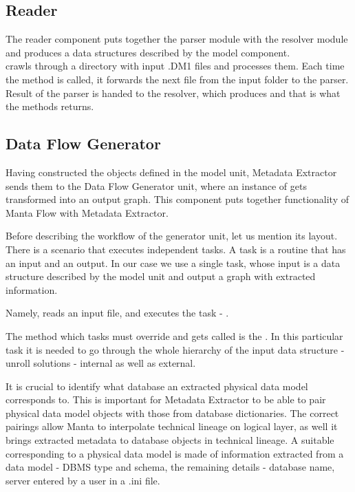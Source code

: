 \subsection{Reader}

The reader component puts together the parser module with the resolver module and produces a data structures described by the model component. \\

 crawls through a directory with input .DM1 files and processes them. 
Each time the  method is called, it forwards the next file from the input folder to the parser. Result of the parser is handed to the resolver, which produces  and that is what the  methods returns.

\subsection{Data Flow Generator}

Having constructed the objects defined in the model unit, Metadata Extractor sends them to the Data Flow Generator unit, where an instance of  gets transformed into an output graph. This component puts together functionality of Manta Flow with Metadata Extractor.

Before describing the workflow of the generator unit, let us mention its layout.
There is a scenario that executes independent tasks. A task is a routine that has an input and an output. In our case we use a single task, whose input is a data structure described by the model unit and output a graph with extracted information.

 Namely,  reads an input file, and executes the task - . 
 
 The method which tasks must override and gets called is the . In this particular task it is needed to go through the whole hierarchy of the input data structure -  unroll solutions - internal as well as external.

It is crucial to identify what database an extracted physical data model corresponds to.
This is important for Metadata Extractor to be able to pair physical data model objects with those from database dictionaries. The correct pairings allow Manta to interpolate technical lineage on logical layer, as well it brings extracted metadata to database objects in technical lineage.
A suitable  corresponding to a physical data model is made of information extracted from a data model - DBMS type and schema, the remaining details - database name, server entered by a user in a .ini file.

